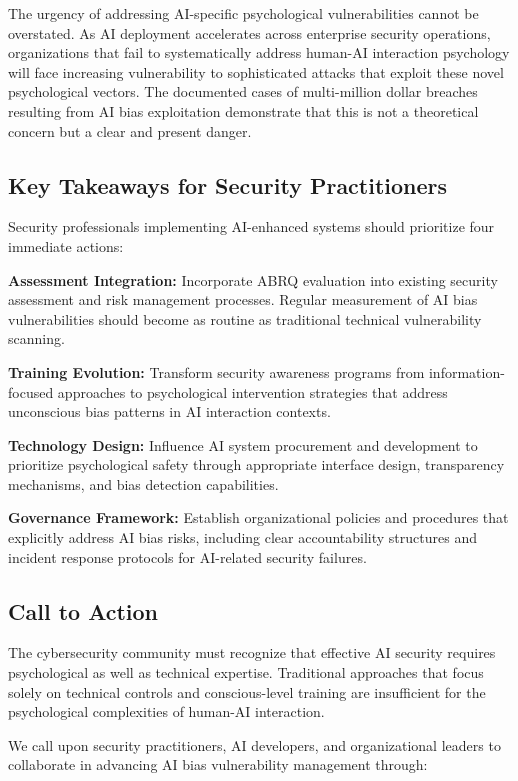 \documentclass[11pt,a4paper]{article}
\begin{document}
The urgency of addressing AI-specific psychological vulnerabilities cannot be overstated. As AI deployment accelerates across enterprise security operations, organizations that fail to systematically address human-AI interaction psychology will face increasing vulnerability to sophisticated attacks that exploit these novel psychological vectors. The documented cases of multi-million dollar breaches resulting from AI bias exploitation demonstrate that this is not a theoretical concern but a clear and present danger.

\subsection{Key Takeaways for Security Practitioners}

Security professionals implementing AI-enhanced systems should prioritize four immediate actions:

\textbf{Assessment Integration:} Incorporate ABRQ evaluation into existing security assessment and risk management processes. Regular measurement of AI bias vulnerabilities should become as routine as traditional technical vulnerability scanning.

\textbf{Training Evolution:} Transform security awareness programs from information-focused approaches to psychological intervention strategies that address unconscious bias patterns in AI interaction contexts.

\textbf{Technology Design:} Influence AI system procurement and development to prioritize psychological safety through appropriate interface design, transparency mechanisms, and bias detection capabilities.

\textbf{Governance Framework:} Establish organizational policies and procedures that explicitly address AI bias risks, including clear accountability structures and incident response protocols for AI-related security failures.

\subsection{Call to Action}

The cybersecurity community must recognize that effective AI security requires psychological as well as technical expertise. Traditional approaches that focus solely on technical controls and conscious-level training are insufficient for the psychological complexities of human-AI interaction.

We call upon security practitioners, AI developers, and organizational leaders to collaborate in advancing AI bias vulnerability management through:
\end{document}
